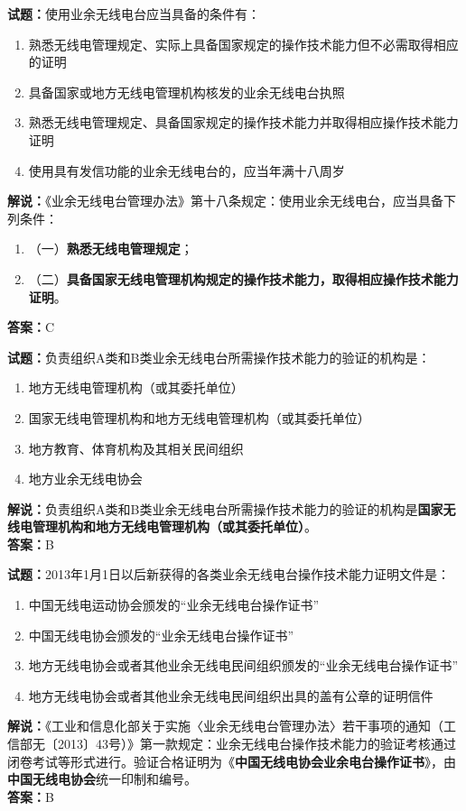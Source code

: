 \documentclass{ctexbook}
\begin{document}
\noindent\textbf{试题：}使用业余无线电台应当具备的条件有：
\begin{enumerate}[leftmargin=3em]
  \item 熟悉无线电管理规定、实际上具备国家规定的操作技术能力但不必需取得相应的证明
  \item 具备国家或地方无线电管理机构核发的业余无线电台执照
  \item 熟悉无线电管理规定、具备国家规定的操作技术能力并取得相应操作技术能力证明
  \item 使用具有发信功能的业余无线电台的，应当年满十八周岁
\end{enumerate}
\noindent\textbf{解说：}《业余无线电台管理办法》第十八条规定：使用业余无线电台，应当具备下列条件：
\begin{enumerate}[label=, leftmargin=1em]
  \item（一）\textbf{熟悉无线电管理规定}；
  \item（二）\textbf{具备国家无线电管理机构规定的操作技术能力，取得相应操作技术能力证明}。
\end{enumerate}
\noindent\textbf{答案：}C

\bigskip

\noindent\textbf{试题：}负责组织A类和B类业余无线电台所需操作技术能力的验证的机构是：
\begin{enumerate}[leftmargin=3em]
  \item 地方无线电管理机构（或其委托单位）
  \item 国家无线电管理机构和地方无线电管理机构（或其委托单位）
  \item 地方教育、体育机构及其相关民间组织
  \item 地方业余无线电协会
\end{enumerate}
\noindent\textbf{解说：}负责组织A类和B类业余无线电台所需操作技术能力的验证的机构是\textbf{国家无线电管理机构和地方无线电管理机构（或其委托单位）}。\\\noindent\textbf{答案：}B

\bigskip

\noindent\textbf{试题：}2013年1月1日以后新获得的各类业余无线电台操作技术能力证明文件是：
\begin{enumerate}[leftmargin=3em]
  \item 中国无线电运动协会颁发的“业余无线电台操作证书”
  \item 中国无线电协会颁发的“业余无线电台操作证书”
  \item 地方无线电协会或者其他业余无线电民间组织颁发的“业余无线电台操作证书”
  \item 地方无线电协会或者其他业余无线电民间组织出具的盖有公章的证明信件
\end{enumerate}
\noindent\textbf{解说：}《工业和信息化部关于实施〈业余无线电台管理办法〉若干事项的通知（工信部无〔2013〕43号）》第一款规定：业余无线电台操作技术能力的验证考核通过闭卷考试等形式进行。验证合格证明为《\textbf{中国无线电协会业余电台操作证书}》，由\textbf{中国无线电协会}统一印制和编号。\\\noindent\textbf{答案：}B
\end{document}
